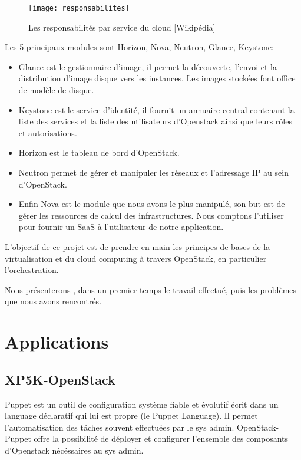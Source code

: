 \documentclass{report}
\begin{document}
    \begin{figure}[ht]
        \texttt{[image: responsabilites]}
        \caption{Les responsabilités par service du cloud [Wikipédia]}
    \end{figure}  
    
    Les 5 principaux modules sont Horizon, Nova, Neutron, Glance, Keystone:
    \begin{itemize}
        \item Glance est le gestionnaire d'image, il permet la découverte, l'envoi et la distribution d'image disque vers les instances. Les images stockées font office de modèle de disque.
        \item  Keystone est le service d'identité, il fournit un annuaire central contenant la liste des services et la liste des utilisateurs d'Openstack ainsi que leurs rôles et autorisations.
        \item  Horizon est le tableau de bord d'OpenStack.
        \item  Neutron permet de gérer et manipuler les réseaux et l'adressage IP au sein d'OpenStack.
        \item  Enfin Nova est le module que nous avons le plus manipulé, son but est de gérer les ressources de calcul des infrastructures. Nous comptons l'utiliser pour fournir un SaaS à l'utilisateur de notre application. 
    \end{itemize}
    \bigbreak
    
    L'objectif de ce projet est de prendre en main les principes de bases de la virtualisation et du cloud computing à travers OpenStack, en particulier l'orchestration.\bigbreak
    
    Nous présenterons , dans un premier temps le travail effectué, puis les problèmes que nous avons rencontrés.\bigbreak
    
    
\newpage
\chapter{Applications}
    \section{XP5K-OpenStack}
        Puppet est un outil de configuration système fiable et évolutif écrit dans un language déclaratif qui lui est propre (le Puppet Language).
        Il permet l'automatisation des tâches souvent effectuées par le sys admin.
        OpenStack-Puppet offre la possibilité de déployer et configurer l'ensemble des composants d'Openstack nécéssaires au sys admin.
            
\end{document}
